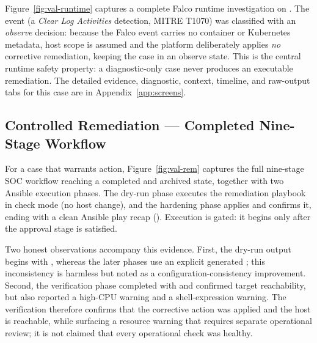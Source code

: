 Figure~\ref{fig:val-runtime} captures a complete Falco runtime investigation on . The event (a \emph{Clear Log Activities} detection, MITRE T1070) was classified with an \emph{observe} decision: because the Falco event carries no container or Kubernetes metadata, host scope is assumed and the platform deliberately applies \emph{no} corrective remediation, keeping the case in an observe state. This is the central runtime safety property: a diagnostic-only case never produces an executable remediation. The detailed evidence, diagnostic, context, timeline, and raw-output tabs for this case are in Appendix~\ref{app:screens}.


\subsection{Controlled Remediation --- Completed Nine-Stage Workflow}

For a case that warrants action, Figure~\ref{fig:val-rem} captures the full nine-stage SOC workflow reaching a completed and archived state, together with two Ansible execution phases. The dry-run phase executes the remediation playbook in check mode (no host change), and the hardening phase applies and confirms it, ending with a clean Ansible play recap (). Execution is gated: it begins only after the approval stage is satisfied.


Two honest observations accompany this evidence. First, the dry-run output begins with , whereas the later phases use an explicit generated ; this inconsistency is harmless but noted as a configuration-consistency improvement. Second, the verification phase completed with  and confirmed target reachability, but also reported a high-CPU warning and a shell-expression warning. The verification therefore confirms that the corrective action was applied and the host is reachable, while surfacing a resource warning that requires separate operational review; it is not claimed that every operational check was healthy.

